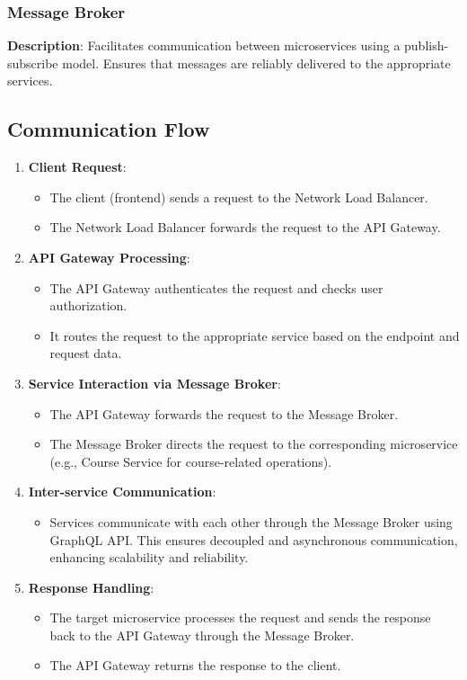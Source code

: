 \subsubsection{Message Broker}
\textbf{Description}: Facilitates communication between microservices using a publish-subscribe model. Ensures that messages are reliably delivered to the appropriate services.

\subsection{Communication Flow}

\begin{enumerate}
    \item \textbf{Client Request}:
    \begin{itemize}
        \item The client (frontend) sends a request to the Network Load Balancer.
        \item The Network Load Balancer forwards the request to the API Gateway.
    \end{itemize}

    \item \textbf{API Gateway Processing}:
    \begin{itemize}
        \item The API Gateway authenticates the request and checks user authorization.
        \item It routes the request to the appropriate service based on the endpoint and request data.
    \end{itemize}

    \item \textbf{Service Interaction via Message Broker}:
    \begin{itemize}
        \item The API Gateway forwards the request to the Message Broker.
        \item The Message Broker directs the request to the corresponding microservice (e.g., Course Service for course-related operations).
    \end{itemize}

    \item \textbf{Inter-service Communication}:
    \begin{itemize}
        \item Services communicate with each other through the Message Broker using GraphQL API. This ensures decoupled and asynchronous communication, enhancing scalability and reliability.
    \end{itemize}

    \item \textbf{Response Handling}:
    \begin{itemize}
        \item The target microservice processes the request and sends the response back to the API Gateway through the Message Broker.
        \item The API Gateway returns the response to the client.
    \end{itemize}
\end{enumerate}

